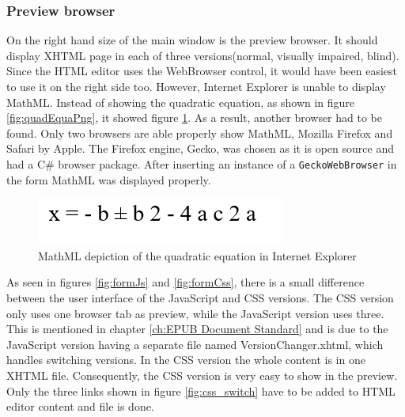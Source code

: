 \subsubsection{Preview browser}

On the right hand size of the main window is the preview browser. It should display XHTML page in each of three versions(normal, visually impaired, blind). Since the HTML editor uses the WebBrowser control, it would have been easiest to use it on the right side too. However, Internet Explorer is unable to display MathML. Instead of showing the quadratic equation, as shown in figure \ref{fig:quadEquaPng}, it showed figure \ref{fig:IEmathml}. As a result, another browser had to be found. Only two browsers are able properly show MathML, Mozilla Firefox and Safari by Apple. The Firefox engine, Gecko, was chosen as it is open source and had a C\# browser package. After inserting an instance of a \lstinline|GeckoWebBrowser| in the form MathML was displayed properly.

\begin{figure}
	\begin{center}
		\includegraphics[width=\linewidth/2]{figures/IEmathml.png}	
		\caption{MathML depiction of the quadratic equation in Internet Explorer}
		\label{fig:IEmathml}
	\end{center}
\end{figure}

As seen in figures \ref{fig:formJs} and \ref{fig:formCss}, there is a small difference between the user interface of the JavaScript and CSS versions. The CSS version only uses one browser tab as preview, while the JavaScript version uses three. This is mentioned in chapter \ref{ch:EPUB Document Standard} and is due to the JavaScript version having a separate file named VersionChanger.xhtml, which handles switching versions. In the CSS version the whole content is in one XHTML file. Consequently, the CSS version is very easy to show in the preview. Only the three links shown in figure \ref{fig:css_switch} have to be added to HTML editor content and file is done.

